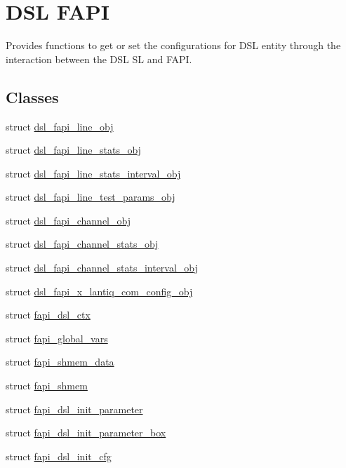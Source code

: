 \hypertarget{group__FAPI__DSL}{\section{D\-S\-L F\-A\-P\-I}
\label{group__FAPI__DSL}
}


Provides functions to get or set the configurations for D\-S\-L entity through the interaction between the D\-S\-L S\-L and F\-A\-P\-I.  


\subsection*{Classes}
\begin{DoxyCompactItemize}
\item 
struct \hyperlink{structdsl__fapi__line__obj}{dsl\-\_\-fapi\-\_\-line\-\_\-obj}
\item 
struct \hyperlink{structdsl__fapi__line__stats__obj}{dsl\-\_\-fapi\-\_\-line\-\_\-stats\-\_\-obj}
\item 
struct \hyperlink{structdsl__fapi__line__stats__interval__obj}{dsl\-\_\-fapi\-\_\-line\-\_\-stats\-\_\-interval\-\_\-obj}
\item 
struct \hyperlink{structdsl__fapi__line__test__params__obj}{dsl\-\_\-fapi\-\_\-line\-\_\-test\-\_\-params\-\_\-obj}
\item 
struct \hyperlink{structdsl__fapi__channel__obj}{dsl\-\_\-fapi\-\_\-channel\-\_\-obj}
\item 
struct \hyperlink{structdsl__fapi__channel__stats__obj}{dsl\-\_\-fapi\-\_\-channel\-\_\-stats\-\_\-obj}
\item 
struct \hyperlink{structdsl__fapi__channel__stats__interval__obj}{dsl\-\_\-fapi\-\_\-channel\-\_\-stats\-\_\-interval\-\_\-obj}
\item 
struct \hyperlink{structdsl__fapi__x__lantiq__com__config__obj}{dsl\-\_\-fapi\-\_\-x\-\_\-lantiq\-\_\-com\-\_\-config\-\_\-obj}
\item 
struct \hyperlink{structfapi__dsl__ctx}{fapi\-\_\-dsl\-\_\-ctx}
\item 
struct \hyperlink{structfapi__global__vars}{fapi\-\_\-global\-\_\-vars}
\item 
struct \hyperlink{structfapi__shmem__data}{fapi\-\_\-shmem\-\_\-data}
\item 
struct \hyperlink{structfapi__shmem}{fapi\-\_\-shmem}
\item 
struct \hyperlink{structfapi__dsl__init__parameter}{fapi\-\_\-dsl\-\_\-init\-\_\-parameter}
\item 
struct \hyperlink{structfapi__dsl__init__parameter__box}{fapi\-\_\-dsl\-\_\-init\-\_\-parameter\-\_\-box}
\item 
struct \hyperlink{structfapi__dsl__init__cfg}{fapi\-\_\-dsl\-\_\-init\-\_\-cfg}
\end{DoxyCompactItemize}
